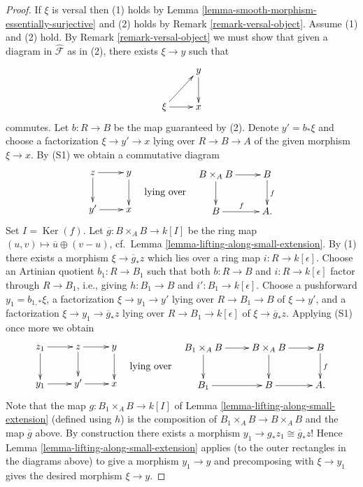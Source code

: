 \documentclass{stacks-project}
\theoremstyle{plain}
\theoremstyle{definition}
\theoremstyle{remark}
\numberwithin{equation}{subsection}
\def\Ker{\mathop{\mathrm{Ker}}}
\begin{document}
\begin{proof}
If $\xi$ is versal then (1) holds by
Lemma \ref{lemma-smooth-morphism-essentially-surjective}
and (2) holds by
Remark \ref{remark-versal-object}.
Assume (1) and (2) hold. By
Remark \ref{remark-versal-object}
we must show that given a diagram in $\widehat{\mathcal{F}}$ as in (2),
there exists $\xi \to y$ such that
$$
\xymatrix{
            &  y \ar[d] \\
\xi \ar[ur] \ar[r]  &  x
}
$$
commutes. Let $b : R \to B$ be the map guaranteed by (2). Denote
$y' = b_*\xi$ and choose a factorization $\xi \to y' \to x$
lying over $R \to B \to A$ of the given morphism $\xi \to x$.
By (S1) we obtain a commutative diagram
$$
\vcenter{
\xymatrix{
z  \ar[r] \ar[d]          &  y \ar[d] \\
y' \ar[r]  &  x
}
}
\quad\text{lying over}\quad
\vcenter{
\xymatrix{
B \times_A B \ar[d] \ar[r] &   B  \ar[d]^{f} \\
B \ar[r]^{f} &   A .
}
}
$$
Set $I = \Ker(f)$. Let $\overline{g} : B \times_A B \to k[I]$
be the ring map $(u, v) \mapsto \overline{u} \oplus (v - u)$,
cf.\ Lemma \ref{lemma-lifting-along-small-extension}.
By (1) there exists a morphism $\xi \to \overline{g}_*z$ which lies over a ring
map $i : R \to k[\epsilon]$. Choose an Artinian quotient
$b_1 : R \to B_1$ such that both $b : R \to B$ and $i : R \to k[\epsilon]$
factor through $R \to B_1$, i.e., giving
$h : B_1 \to B$ and $i' : B_1 \to k[\epsilon]$.
Choose a pushforward $y_1 = b_{1, *}\xi$, a factorization
$\xi \to y_1 \to y'$ lying over $R \to B_1 \to B$ of $\xi \to y'$, and a
factorization $\xi \to y_1 \to \overline{g}_*z$ lying over
$R \to B_1 \to k[\epsilon]$ of $\xi \to \overline{g}_*z$.
Applying (S1) once more we obtain
$$
\vcenter{
\xymatrix{
z_1  \ar[r] \ar[d] & z \ar[r] \ar[d] & y \ar[d] \\
y_1 \ar[r] & y' \ar[r] &  x
}
}
\quad\text{lying over}\quad
\vcenter{
\xymatrix{
B_1 \times_A B \ar[d] \ar[r] & B \times_A B \ar[r] \ar[d] & B \ar[d]^{f} \\
B_1 \ar[r]  & B \ar[r] &  A .
}
}
$$
Note that the map $g : B_1 \times_A B \to k[I]$ of
Lemma \ref{lemma-lifting-along-small-extension}
(defined using $h$)
is the composition of $B_1 \times_A B \to B \times_A B$ and the map
$\overline{g}$ above. By construction there exists a morphism
$y_1 \to g_*z_1 \cong \overline{g}_*z$! Hence
Lemma \ref{lemma-lifting-along-small-extension}
applies (to the outer rectangles in the diagrams above)
to give a morphism $y_1 \to y$ and precomposing
with $\xi \to y_1$ gives the desired morphism $\xi \to y$.
\end{proof}
\end{document}
